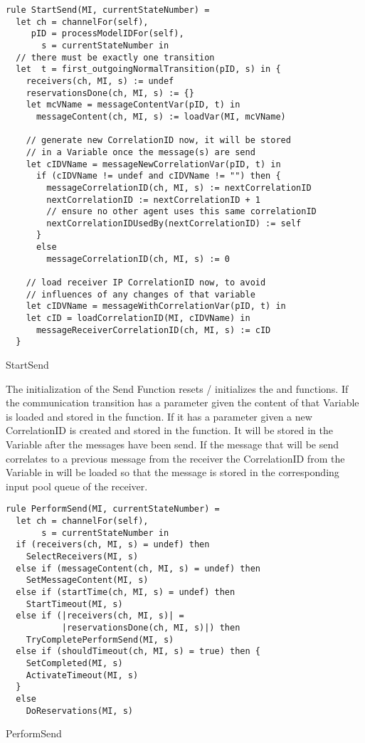 \begin{listing}[htbp]
\begin{verbatim}
rule StartSend(MI, currentStateNumber) =
  let ch = channelFor(self),
     pID = processModelIDFor(self),
       s = currentStateNumber in
  // there must be exactly one transition
  let  t = first_outgoingNormalTransition(pID, s) in {
    receivers(ch, MI, s) := undef
    reservationsDone(ch, MI, s) := {}
    let mcVName = messageContentVar(pID, t) in
      messageContent(ch, MI, s) := loadVar(MI, mcVName)

    // generate new CorrelationID now, it will be stored
    // in a Variable once the message(s) are send
    let cIDVName = messageNewCorrelationVar(pID, t) in
      if (cIDVName != undef and cIDVName != "") then {
        messageCorrelationID(ch, MI, s) := nextCorrelationID
        nextCorrelationID := nextCorrelationID + 1
        // ensure no other agent uses this same correlationID
        nextCorrelationIDUsedBy(nextCorrelationID) := self
      }
      else
        messageCorrelationID(ch, MI, s) := 0

    // load receiver IP CorrelationID now, to avoid
    // influences of any changes of that variable
    let cIDVName = messageWithCorrelationVar(pID, t) in
    let cID = loadCorrelationID(MI, cIDVName) in
      messageReceiverCorrelationID(ch, MI, s) := cID
  }
\end{verbatim}
\caption{StartSend}
\label{lst:shortasm:StartSend}
\end{listing}


The initialization of the Send Function resets / initializes the  and  functions. If the communication transition has a  parameter given the content of that Variable is loaded and stored in the  function. If it has a  parameter given a new CorrelationID is created and stored in the  function. It will be stored in the Variable after the messages have been send. If the message that will be send correlates to a previous message from the receiver the CorrelationID from the Variable in  will be loaded so that the message is stored in the corresponding input pool queue of the receiver.


\begin{listing}[htbp]
\begin{verbatim}
rule PerformSend(MI, currentStateNumber) =
  let ch = channelFor(self),
       s = currentStateNumber in
  if (receivers(ch, MI, s) = undef) then
    SelectReceivers(MI, s)
  else if (messageContent(ch, MI, s) = undef) then
    SetMessageContent(MI, s)
  else if (startTime(ch, MI, s) = undef) then
    StartTimeout(MI, s)
  else if (|receivers(ch, MI, s)| =
           |reservationsDone(ch, MI, s)|) then
    TryCompletePerformSend(MI, s)
  else if (shouldTimeout(ch, MI, s) = true) then {
    SetCompleted(MI, s)
    ActivateTimeout(MI, s)
  }
  else
    DoReservations(MI, s)
\end{verbatim}
\caption{PerformSend}
\label{lst:shortasm:PerformSend}
\end{listing}


